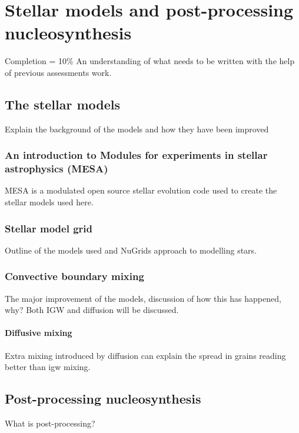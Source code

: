 \chapter{Stellar models and post-processing nucleosynthesis}

Completion = 10\%
An understanding of what needs to be written with the help of previous assessments work.

\section{The stellar models}

Explain the background of the models and how they have been improved

\subsection{An introduction to Modules for experiments in stellar astrophysics (MESA)}

MESA is a modulated open source stellar evolution code used to create the stellar models used here.

\subsection{Stellar model grid}

Outline of the models used and NuGrids approach to modelling stars.

\subsection{Convective boundary mixing}

The major improvement of the models, discussion of how this has happened, why? Both IGW and diffusion will be discussed.

\subsubsection{Diffusive mixing}

Extra mixing introduced by diffusion can explain the spread in grains reading better than \acrfull{igw} mixing.

\section{Post-processing nucleosynthesis}

What is post-processing?

